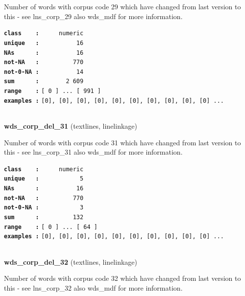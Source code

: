 \documentclass[]{article}
\begin{document}
Number of words with corpus code 29 which have changed from last version
to this - see lns\_corp\_29 also wds\_mdf for more information.

\textbf{\texttt{class\ \ \ \ :}} \texttt{~~~~~numeric}\\
\textbf{\texttt{unique\ \ \ :}} \texttt{~~~~~~~~~~16}\\
\textbf{\texttt{NAs\ \ \ \ \ \ :}} \texttt{~~~~~~~~~~16}\\
\textbf{\texttt{not-NA\ \ \ :}} \texttt{~~~~~~~~~770}\\
\textbf{\texttt{not-0-NA\ :}} \texttt{~~~~~~~~~~14}\\
\textbf{\texttt{sum\ \ \ \ \ \ :}} \texttt{~~~~~~~2~609}\\
\textbf{\texttt{range\ \ \ \ :}}
\texttt{{[}\ 0\ {]}\ ...\ {[}\ 991\ {]}}\\
\textbf{\texttt{examples\ :}}
\texttt{{[}0{]},\ {[}0{]},\ {[}0{]},\ {[}0{]},\ {[}0{]},\ {[}0{]},\ {[}0{]},\ {[}0{]},\ {[}0{]},\ {[}0{]}\ ...}\\

~

\textbf{wds\_corp\_del\_31} (textlines, linelinkage)

Number of words with corpus code 31 which have changed from last version
to this - see lns\_corp\_31 also wds\_mdf for more information.

\textbf{\texttt{class\ \ \ \ :}} \texttt{~~~~~numeric}\\
\textbf{\texttt{unique\ \ \ :}} \texttt{~~~~~~~~~~~5}\\
\textbf{\texttt{NAs\ \ \ \ \ \ :}} \texttt{~~~~~~~~~~16}\\
\textbf{\texttt{not-NA\ \ \ :}} \texttt{~~~~~~~~~770}\\
\textbf{\texttt{not-0-NA\ :}} \texttt{~~~~~~~~~~~3}\\
\textbf{\texttt{sum\ \ \ \ \ \ :}} \texttt{~~~~~~~~~132}\\
\textbf{\texttt{range\ \ \ \ :}}
\texttt{{[}\ 0\ {]}\ ...\ {[}\ 64\ {]}}\\
\textbf{\texttt{examples\ :}}
\texttt{{[}0{]},\ {[}0{]},\ {[}0{]},\ {[}0{]},\ {[}0{]},\ {[}0{]},\ {[}0{]},\ {[}0{]},\ {[}0{]},\ {[}0{]}\ ...}\\

~

\textbf{wds\_corp\_del\_32} (textlines, linelinkage)

Number of words with corpus code 32 which have changed from last version
to this - see lns\_corp\_32 also wds\_mdf for more information.
\end{document}
